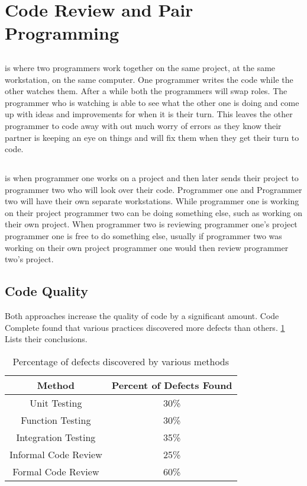 \documentclass{article}
\begin{document}
\section{Code Review and Pair Programming}

\subsection{\PP}
\PP is where two programmers work together on the same project, at the same workstation, on the same computer. One programmer writes the code while the other watches them. After a while both the programmers will swap roles. The programmer who is watching is able to see what the other one is doing and come up with ideas and improvements for when it is their turn. This leaves the other programmer to code away with out much worry of errors as they know their partner is keeping an eye on things and will fix them when they get their turn to code.

\subsection{\CR}
\CR is when programmer one works on a project and then later sends their project to programmer two who will look over their code. Programmer one and Programmer two will have their own separate workstations. While programmer one is working on their project programmer two can be doing something else, such as working on their own project. When programmer two is reviewing programmer one's project programmer one is free to do something else, usually if programmer two was working on their own project programmer one would then review programmer two's project. 

\subsection{Code Quality}

Both approaches increase the quality of code by a significant amount. Code Complete\cite[Table 20-2]{McConnell:2004:CCS:1096143} found that various practices discovered more defects than others. \ref{tab:defect} Lists their conclusions.


\begin{table}[hb]
\begin{tabular}{c|c}
Method & Percent of Defects Found\\\hline
Unit Testing & 30\% \\
Function Testing & 30\% \\
Integration Testing & 35\% \\
Informal Code Review & 25\% \\
Formal Code Review & 60\%\\
\end{tabular}
\label{tab:defect}
\caption{Percentage of defects discovered by various methods}
\end{table}
\end{document}
